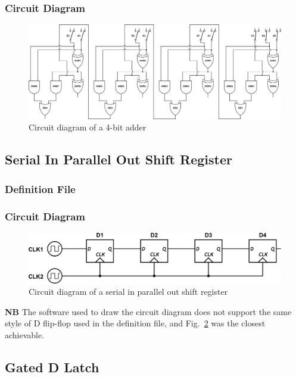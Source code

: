 \documentclass[a4paper,10pt]{article}
\begin{document}
\subsubsection{Circuit Diagram}
\begin{figure}[h]
 \centering
 \includegraphics[width=14cm]{../../examples/4-bit-adder.png}
 \caption{Circuit diagram of a 4-bit adder}
 \label{fig:example-adder}
\end{figure}

\subsection{Serial In Parallel Out Shift Register}

\subsubsection{Definition File}


\subsubsection{Circuit Diagram}
\begin{figure}[h]
 \centering
 \includegraphics[width=12cm]{../../examples/sipo.png}
 \caption{Circuit diagram of a serial in parallel out shift register}
 \label{fig:example-sipo}
\end{figure}

\textbf{NB} The software used to draw the circuit diagram does not support the same style of D flip-flop used in the definition file, and Fig.~\ref{fig:example-sipo} was the closest achievable.

\subsection{Gated D Latch}
\end{document}
